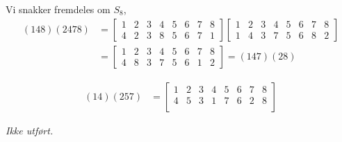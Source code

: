 \documentclass[a4paper,norsk,12pt]{article}
\begin{document}
Vi snakker fremdeles om $S_8$,
\begin{align*}
  (148)(2478) &=
  \left[\begin{matrix}
      1 & 2 & 3 & 4 & 5 & 6 & 7 & 8 \\
      4 & 2 & 3 & 8 & 5 & 6 & 7 & 1
  \end{matrix}\right] 
  \left[\begin{matrix}
      1 & 2 & 3 & 4 & 5 & 6 & 7 & 8 \\
      1 & 4 & 3 & 7 & 5 & 6 & 8 & 2
  \end{matrix}\right] \\
  &=
  \left[\begin{matrix}
      1 & 2 & 3 & 4 & 5 & 6 & 7 & 8 \\
      4 & 8 & 3 & 7 & 5 & 6 & 1 & 2
  \end{matrix}\right]
  = (147)(28)
\end{align*}

\begin{align*}
  (14)(257) &=
  \left[\begin{matrix}
      1 & 2 & 3 & 4 & 5 & 6 & 7 & 8 \\
      4 & 5 & 3 & 1 & 7 & 6 & 2 & 8 \\
  \end{matrix}\right]
\end{align*}

\textit{Ikke utført.}
\end{document}
